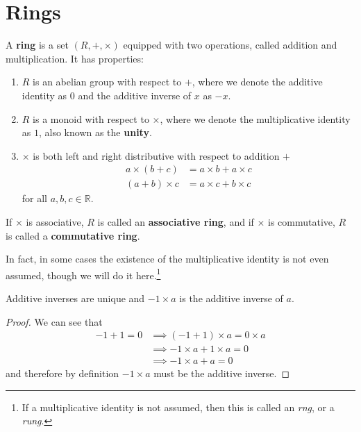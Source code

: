 \section{Rings}

  \begin{definition}[Ring]
    A \textbf{ring} is a set $(R, +, \times)$ equipped with two operations, called addition and multiplication. It has properties: 
    \begin{enumerate}
      \item $R$ is an abelian group with respect to $+$, where we denote the additive identity as $0$ and the additive inverse of $x$ as $-x$. 
      \item $R$ is a monoid with respect to $\times$, where we denote the multiplicative identity as $1$, also known as the \textbf{unity}. 
      \item $\times$ is both left and right distributive with respect to addition $+$
      \begin{align}
        a \times (b + c) & = a\times b + a\times c \\ 
        (a + b) \times c & = a\times c + b\times c 
      \end{align}
      for all $a, b, c \in \mathbb{R}$. 
    \end{enumerate} 
    If $\times$ is associative, $R$ is called an \textbf{associative ring}, and if $\times$ is commutative, $R$ is called a \textbf{commutative ring}. 
  \end{definition}

  In fact, in some cases the existence of the multiplicative identity is not even assumed, though we will do it here.\footnote{If a multiplicative identity is not assumed, then this is called an \textit{rng}, or a \textit{rung}.}

  \begin{lemma} 
    Additive inverses are unique and $-1 \times a$ is the additive inverse of $a$. 
  \end{lemma}
  \begin{proof}
    We can see that 
    \begin{align}
      -1 + 1 = 0 & \implies (-1 + 1) \times a = 0 \times a \\
                 & \implies -1 \times a + 1 \times a = 0 \\
                 & \implies -1 \times a + a = 0 
    \end{align}
    and therefore by definition $-1 \times a$ must be the additive inverse. 
  \end{proof} 

